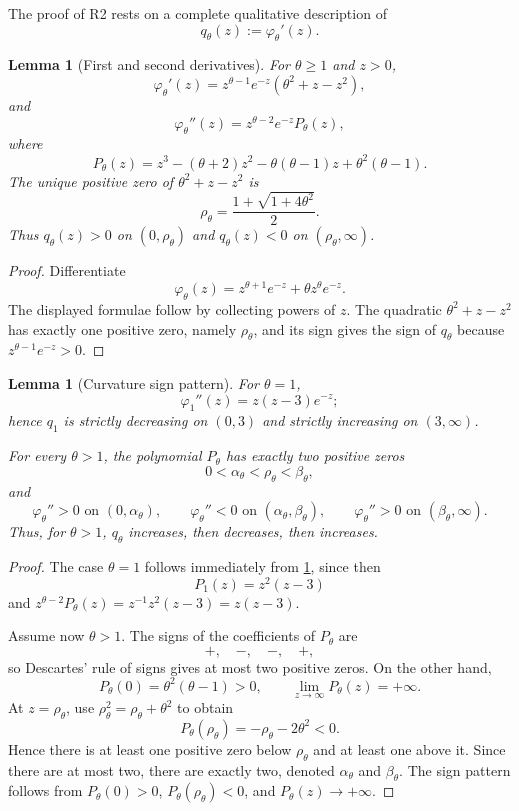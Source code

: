 \documentclass[11pt]{article}
\newtheorem{lemma}[theorem]{Lemma}
\theoremstyle{definition}
\begin{document}
The proof of R2 rests on a complete qualitative description of
\[
  q_\theta(z):=\varphi_\theta'(z).
\]

\begin{lemma}[First and second derivatives]\label{lem:derivatives}
For $\theta\ge1$ and $z>0$,
\[
  \varphi_\theta'(z)=z^{\theta-1}e^{-z}(\theta^2+z-z^2),
\]
and
\[
  \varphi_\theta''(z)=z^{\theta-2}e^{-z}P_\theta(z),
\]
where
\[
  P_\theta(z)=z^3-(\theta+2)z^2-\theta(\theta-1)z+\theta^2(\theta-1).
\]
The unique positive zero of $\theta^2+z-z^2$ is
\[
  \rho_\theta=\frac{1+\sqrt{1+4\theta^2}}{2}.
\]
Thus $q_\theta(z)>0$ on $(0,\rho_\theta)$ and $q_\theta(z)<0$ on $(\rho_\theta,\infty)$.
\end{lemma}

\begin{proof}
Differentiate
\[
  \varphi_\theta(z)=z^{\theta+1}e^{-z}+\theta z^\theta e^{-z}.
\]
The displayed formulae follow by collecting powers of $z$.  The quadratic $\theta^2+z-z^2$ has exactly one positive zero, namely $\rho_\theta$, and its sign gives the sign of $q_\theta$ because $z^{\theta-1}e^{-z}>0$.
\end{proof}

\begin{lemma}[Curvature sign pattern]\label{lem:curvature}
For $\theta=1$,
\[
  \varphi_1''(z)=z(z-3)e^{-z};
\]
hence $q_1$ is strictly decreasing on $(0,3)$ and strictly increasing on $(3,\infty)$.

For every $\theta>1$, the polynomial $P_\theta$ has exactly two positive zeros
\[
  0<\alpha_\theta<\rho_\theta<\beta_\theta,
\]
and
\[
  \varphi_\theta''>0\text{ on }(0,\alpha_\theta),
  \qquad
  \varphi_\theta''<0\text{ on }(\alpha_\theta,\beta_\theta),
  \qquad
  \varphi_\theta''>0\text{ on }(\beta_\theta,\infty).
\]
Thus, for $\theta>1$, $q_\theta$ increases, then decreases, then increases.
\end{lemma}

\begin{proof}
The case $\theta=1$ follows immediately from \cref{lem:derivatives}, since then
\[
  P_1(z)=z^2(z-3)
\]
and $z^{\theta-2}P_\theta(z)=z^{-1}z^2(z-3)=z(z-3)$.

Assume now $\theta>1$.  The signs of the coefficients of $P_\theta$ are
\[
  +,\quad -,\quad -,\quad +,
\]
so Descartes' rule of signs gives at most two positive zeros.  On the other hand,
\[
  P_\theta(0)=\theta^2(\theta-1)>0,
  \qquad
  \lim_{z\to\infty}P_\theta(z)=+\infty.
\]
At $z=\rho_\theta$, use $\rho_\theta^2=\rho_\theta+\theta^2$ to obtain
\[
  P_\theta(\rho_\theta)=-\rho_\theta-2\theta^2<0.
\]
Hence there is at least one positive zero below $\rho_\theta$ and at least one above it.  Since there are at most two, there are exactly two, denoted $\alpha_\theta$ and $\beta_\theta$.  The sign pattern follows from $P_\theta(0)>0$, $P_\theta(\rho_\theta)<0$, and $P_\theta(z)\to+\infty$.
\end{proof}
\end{document}
